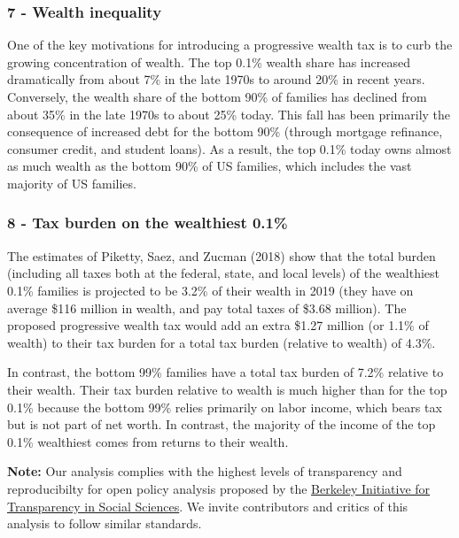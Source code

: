 \documentclass[]{article}
\begin{document}
\hypertarget{wealth-inequality}{%
\subsubsection{7 - Wealth inequality}\label{wealth-inequality}}

One of the key motivations for introducing a progressive wealth tax is
to curb the growing concentration of wealth. The top 0.1\% wealth share
has increased dramatically from about 7\% in the late 1970s to around
20\% in recent years. Conversely, the wealth share of the bottom 90\% of
families has declined from about 35\% in the late 1970s to about 25\%
today. This fall has been primarily the consequence of increased debt
for the bottom 90\% (through mortgage refinance, consumer credit, and
student loans). As a result, the top 0.1\% today owns almost as much
wealth as the bottom 90\% of US families, which includes the vast
majority of US families.

\hypertarget{tax-burden-on-the-wealthiest-0.1}{%
\subsubsection{8 - Tax burden on the wealthiest
0.1\%}\label{tax-burden-on-the-wealthiest-0.1}}

The estimates of Piketty, Saez, and Zucman (2018) show that the total
burden (including all taxes both at the federal, state, and local
levels) of the wealthiest 0.1\% families is projected to be 3.2\% of
their wealth in 2019 (they have on average \$116 million in wealth, and
pay total taxes of \$3.68 million). The proposed progressive wealth tax
would add an extra \$1.27 million (or 1.1\% of wealth) to their tax
burden for a total tax burden (relative to wealth) of 4.3\%.

In contrast, the bottom 99\% families have a total tax burden of 7.2\%
relative to their wealth. Their tax burden relative to wealth is much
higher than for the top 0.1\% because the bottom 99\% relies primarily
on labor income, which bears tax but is not part of net worth. In
contrast, the majority of the income of the top 0.1\% wealthiest comes
from returns to their wealth.

\textbf{Note:} Our analysis complies with the highest levels of
transparency and reproducibilty for open policy analysis proposed by the
\href{https://www.bitss.org/opa/}{Berkeley Initiative for Transparency
in Social Sciences}. We invite contributors and critics of this analysis
to follow similar standards.
\end{document}
